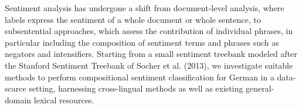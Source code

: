 Sentiment analysis has undergone a shift from document-level analysis, where labels express the sentiment of a whole document or whole sentence, to subsentential approaches, which assess the contribution of individual phrases, in particular including the composition of sentiment terms and phrases such as negators and intensifiers. Starting from a small sentiment treebank modeled after the Stanford Sentiment Treebank of Socher et al. (2013), we investigate suitable methods to perform compositional sentiment classification for German in a data-scarce setting, harnessing cross-lingual methods as well as existing general-domain lexical resources.
